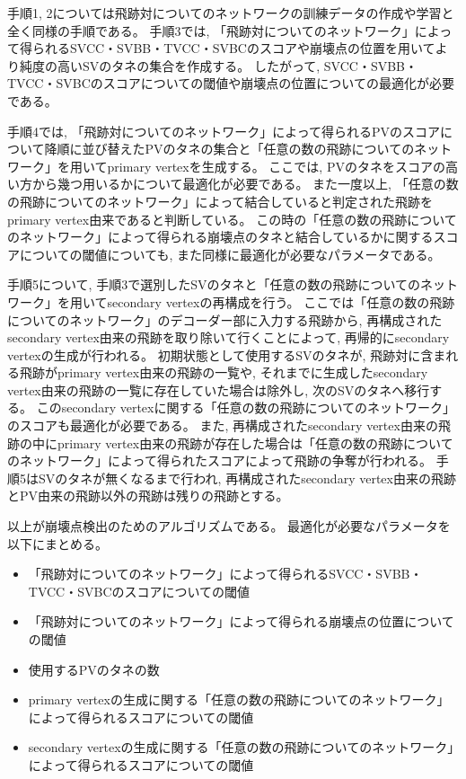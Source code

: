 手順1, 2については飛跡対についてのネットワークの訓練データの作成や学習と全く同様の手順である。
\newpage
手順3では, 「飛跡対についてのネットワーク」によって得られるSVCC・SVBB・TVCC・SVBCのスコアや崩壊点の位置を用いてより純度の高いSVのタネの集合を作成する。
したがって, SVCC・SVBB・TVCC・SVBCのスコアについての閾値や崩壊点の位置についての最適化が必要である。

手順4では, 「飛跡対についてのネットワーク」によって得られるPVのスコアについて降順に並び替えたPVのタネの集合と「任意の数の飛跡についてのネットワーク」を用いてprimary vertexを生成する。
ここでは, PVのタネをスコアの高い方から幾つ用いるかについて最適化が必要である。
また一度以上, 「任意の数の飛跡についてのネットワーク」によって結合していると判定された飛跡をprimary vertex由来であると判断している。
この時の「任意の数の飛跡についてのネットワーク」によって得られる崩壊点のタネと結合しているかに関するスコアについての閾値についても, また同様に最適化が必要なパラメータである。

手順5について, 手順3で選別したSVのタネと「任意の数の飛跡についてのネットワーク」を用いてsecondary vertexの再構成を行う。
ここでは「任意の数の飛跡についてのネットワーク」のデコーダー部に入力する飛跡から, 再構成されたsecondary vertex由来の飛跡を取り除いて行くことによって, 再帰的にsecondary vertexの生成が行われる。
初期状態として使用するSVのタネが, 飛跡対に含まれる飛跡がprimary vertex由来の飛跡の一覧や, それまでに生成したsecondary vertex由来の飛跡の一覧に存在していた場合は除外し, 次のSVのタネへ移行する。
このsecondary vertexに関する「任意の数の飛跡についてのネットワーク」のスコアも最適化が必要である。
また, 再構成されたsecondary vertex由来の飛跡の中にprimary vertex由来の飛跡が存在した場合は「任意の数の飛跡についてのネットワーク」によって得られたスコアによって飛跡の争奪が行われる。
手順5はSVのタネが無くなるまで行われ, 再構成されたsecondary vertex由来の飛跡とPV由来の飛跡以外の飛跡は残りの飛跡とする。

以上が崩壊点検出のためのアルゴリズムである。
最適化が必要なパラメータを以下にまとめる。

\begin{itemize}
 \item 「飛跡対についてのネットワーク」によって得られるSVCC・SVBB・TVCC・SVBCのスコアについての閾値
 \item 「飛跡対についてのネットワーク」によって得られる崩壊点の位置についての閾値
 \item 使用するPVのタネの数
 \item primary vertexの生成に関する「任意の数の飛跡についてのネットワーク」によって得られるスコアについての閾値
 \item secondary vertexの生成に関する「任意の数の飛跡についてのネットワーク」によって得られるスコアについての閾値
\end{itemize}

